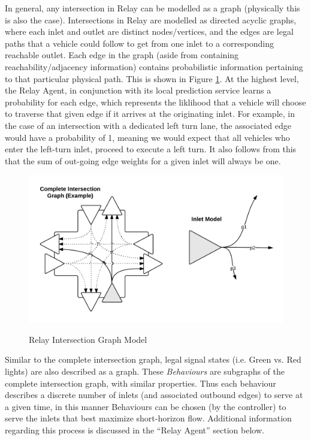 \documentclass{article}
\begin{document}
In general, any intersection in Relay can be modelled as a graph (physically this is also the case).
Intersections in Relay are modelled as directed acyclic graphs, where each inlet and outlet are distinct nodes/vertices, and the edges are legal paths that a vehicle could follow to get from one inlet to a corresponding reachable outlet.
Each edge in the graph (aside from containing reachability/adjacency information) contains probabilistic information pertaining to that particular physical path.
This is shown in Figure \ref{fig:Relay_Intersection_Graph}.
At the highest level, the Relay Agent, in conjunction with its local prediction service learns a probability for each edge, which represents the liklihood that a vehicle will choose to traverse that given edge if it arrives at the originating inlet.
For example, in the case of an intersection with a dedicated left turn lane, the associated edge would have a probability of 1, meaning we would expect that all vehicles who enter the left-turn inlet, proceed to execute a left turn.
It also follows from this that the sum of out-going edge weights for a given inlet will always be one.\\

\begin{figure}[!ht]
	\caption{Relay Intersection Graph Model}
	\includegraphics[width=\textwidth]{figures/Relay_Intersection_Graph.png}
	\label{fig:Relay_Intersection_Graph}
\end{figure}

Similar to the complete intersection graph, legal signal states (i.e. Green vs. Red lights) are also described as a graph.
These \emph{Behaviours} are subgraphs of the complete intersection graph, with similar properties.
Thus each behaviour describes a discrete number of inlets (and associated outbound edges) to serve at a given time, in this manner Behaviours can be chosen (by the controller) to serve the inlets that best maximize short-horizon flow.
Additional information regarding this process is discussed in the ``Relay Agent'' section below.\\
\end{document}
